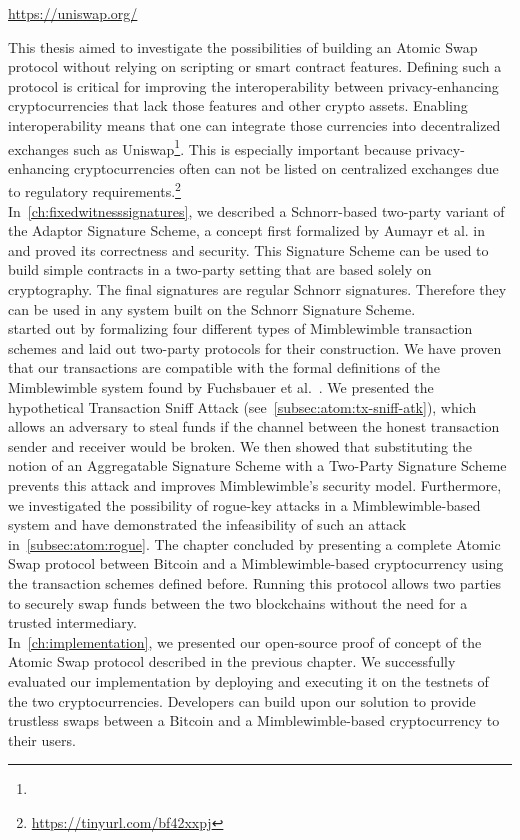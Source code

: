 \urldef{\urluniswp}\url{https://uniswap.org/}

This thesis aimed to investigate the possibilities of building an Atomic Swap protocol without relying on scripting or smart contract features.
Defining such a protocol is critical for improving the interoperability between privacy-enhancing cryptocurrencies that lack those features and other crypto assets.
Enabling interoperability means that one can integrate those currencies into decentralized exchanges such as Uniswap\footnote{\urluniswp}.
This is especially important because privacy-enhancing cryptocurrencies often can not be listed on centralized exchanges due to regulatory requirements.\footnote{\url{https://tinyurl.com/bf42xxpj}}\\
In~\cref{ch:fixedwitnesssignatures}, we described a Schnorr-based two-party variant of the Adaptor Signature Scheme, a concept first formalized by Aumayr et al. in~\cite{aumayr2020bitcoinchannels} and proved its correctness and security.
This Signature Scheme can be used to build simple contracts in a two-party setting that are based solely on cryptography.
The final signatures are regular Schnorr signatures.
Therefore they can be used in any system built on the Schnorr Signature Scheme.\\
 started out by formalizing four different types of Mimblewimble transaction schemes and laid out two-party protocols for their construction.
We have proven that our transactions are compatible with the formal definitions of the Mimblewimble system found by Fuchsbauer et al.~\cite{fuchsbauer2019aggregate}.
We presented the hypothetical Transaction Sniff Attack (see~\cref{subsec:atom:tx-sniff-atk}), which allows an adversary to steal funds if the channel between the honest transaction sender and receiver would be broken.
We then showed that substituting the notion of an Aggregatable Signature Scheme with a Two-Party Signature Scheme prevents this attack and improves Mimblewimble's security model.
Furthermore, we investigated the possibility of rogue-key attacks in a Mimblewimble-based system and have demonstrated the infeasibility of such an attack in~\cref{subsec:atom:rogue}.
The chapter concluded by presenting a complete Atomic Swap protocol between Bitcoin and a Mimblewimble-based cryptocurrency using the transaction schemes defined before.
Running this protocol allows two parties to securely swap funds between the two blockchains without the need for a trusted intermediary.\\
In~\cref{ch:implementation}, we presented our open-source proof of concept of the Atomic Swap protocol described in the previous chapter.
We successfully evaluated our implementation by deploying and executing it on the testnets of the two cryptocurrencies.
Developers can build upon our solution to provide trustless swaps between a Bitcoin and a Mimblewimble-based cryptocurrency to their users.

